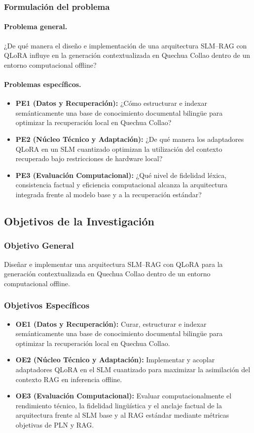 \subsubsection{Formulación del problema}
\paragraph{Problema general.}
¿De qué manera el diseño e implementación de una arquitectura SLM--RAG con QLoRA influye en la generación contextualizada en Quechua Collao dentro de un entorno computacional offline?

\paragraph{Problemas específicos.}
\begin{itemize}
	\item \textbf{PE1 (Datos y Recuperación):} ¿Cómo estructurar e indexar semánticamente una base de conocimiento documental bilingüe para optimizar la recuperación local en Quechua Collao?
	\item \textbf{PE2 (Núcleo Técnico y Adaptación):} ¿De qué manera los adaptadores QLoRA en un SLM cuantizado optimizan la utilización del contexto recuperado bajo restricciones de hardware local?
	\item \textbf{PE3 (Evaluación Computacional):} ¿Qué nivel de fidelidad léxica, consistencia factual y eficiencia computacional alcanza la arquitectura integrada frente al modelo base y a la recuperación estándar?
\end{itemize}

\subsection{Objetivos de la Investigación}

\subsubsection{Objetivo General}
Diseñar e implementar una arquitectura SLM--RAG con QLoRA para la generación contextualizada en Quechua Collao dentro de un entorno computacional offline.

\subsubsection{Objetivos Específicos}
\begin{itemize}
	\item \textbf{OE1 (Datos y Recuperación):} Curar, estructurar e indexar semánticamente una base de conocimiento documental bilingüe para optimizar la recuperación local en Quechua Collao.
	\item \textbf{OE2 (Núcleo Técnico y Adaptación):} Implementar y acoplar adaptadores QLoRA en el SLM cuantizado para maximizar la asimilación del contexto RAG en inferencia offline.
	\item \textbf{OE3 (Evaluación Computacional):} Evaluar computacionalmente el rendimiento técnico, la fidelidad lingüística y el anclaje factual de la arquitectura frente al SLM base y al RAG estándar mediante métricas objetivas de PLN y RAG.
\end{itemize}

